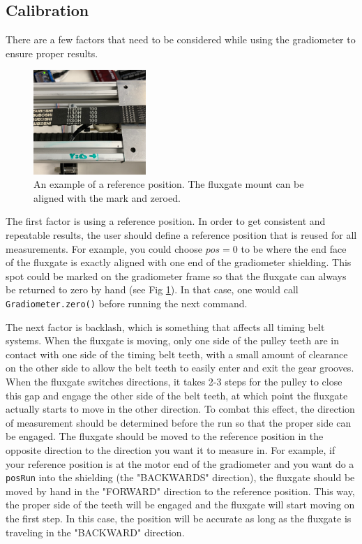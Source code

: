 \documentclass{TheMartianReport}
\newcommand{\pyinline}[1]{\texttt{#1}}
\begin{document}
\subsection{Calibration} \label{subsec:Calibration}
There are a few factors that need to be considered while using the gradiometer to ensure proper results.\begin{figure}
	\centering
	\includegraphics[width=0.38\textwidth]{calib_mark}
	\caption{An example of a reference position. The fluxgate mount can be aligned with the mark and zeroed.}
	\label{fig:CalibMark}
\end{figure}

The first factor is using a reference position. In order to get consistent and repeatable results, the user should define a reference position that is reused for all measurements. For example, you could choose $pos=0$ to be where the end face of the fluxgate is exactly aligned with one end of the gradiometer shielding. This spot could be marked on the gradiometer frame so that the fluxgate can always be returned to zero by hand (see Fig \ref{fig:CalibMark}). In that case, one would call \pyinline{Gradiometer.zero()} before running the next command.

The next factor is backlash, which is something that affects all timing belt systems. When the fluxgate is moving, only one side of the pulley teeth are in contact with one side of the timing belt teeth, with a small amount of clearance on the other side to allow the belt teeth to easily enter and exit the gear grooves. When the fluxgate switches directions, it takes 2-3 steps for the pulley to close this gap and engage the other side of the belt teeth, at which point the fluxgate actually starts to move in the other direction. To combat this effect, the direction of measurement should be determined before the run so that the proper side can be engaged. The fluxgate should be moved to the reference position in the opposite direction to the direction you want it to measure in. For example, if your reference position is at the motor end of the gradiometer and you want do a \pyinline{posRun} into the shielding (the "BACKWARDS" direction), the fluxgate should be moved by hand in the "FORWARD" direction to the reference position. This way, the proper side of the teeth will be engaged and the fluxgate will start moving on the first step. In this case, the position will be accurate as long as the fluxgate is traveling in the "BACKWARD" direction.
\end{document}
